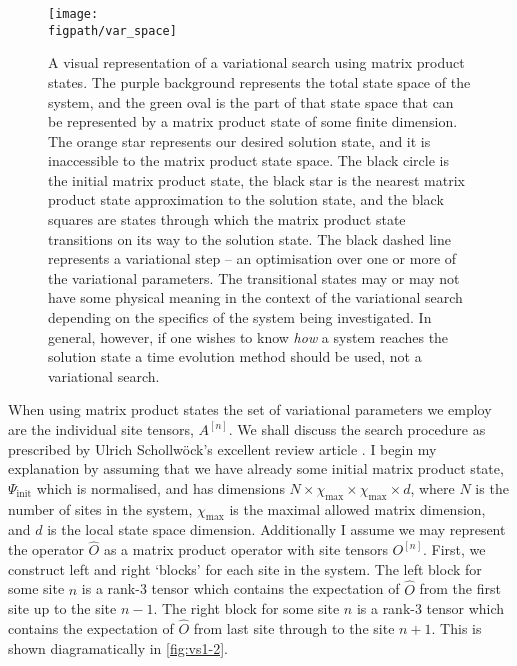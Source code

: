 \begin{figure}[ht!]
\centering
\texttt{[image: \\figpath/var\_space]}
\caption{A visual representation of a variational search using matrix product states. The purple background represents the total state space of the system, and the green oval is the part of that state space that can be represented by a matrix product state of some finite dimension. The orange star represents our desired solution state, and it is inaccessible to the matrix product state space. The black circle is the initial matrix product state, the black star is the nearest matrix product state approximation to the solution state, and the black squares are states through which the matrix product state transitions on its way to the solution state. The black dashed line represents a variational step -- an optimisation over one or more of the variational parameters. The transitional states may or may not have some physical meaning in the context of the variational search depending on the specifics of the system being investigated. In general, however, if one wishes to know \emph{how} a system reaches the solution state a time evolution method should be used, not a variational search.}
\label{fig:vs1-1}
\end{figure}

When using matrix product states the set of variational parameters we employ are the individual site tensors, \(A^{[n]}\). We shall discuss the search procedure as prescribed by Ulrich Schollw\"{o}ck's excellent review article \cite{Schollwoeck11}. I begin my explanation by assuming that we have already some initial matrix product state, \(\Psi_{\mathrm{init}}\) which is normalised, and has dimensions \(N \times \chi_{\mathrm{max}} \times \chi_{\mathrm{max}} \times d\), where \(N\) is the number of sites in the system, \(\chi_{\mathrm{max}}\) is the maximal allowed matrix dimension, and \(d\) is the local state space dimension. Additionally I assume we may represent the operator \(\hat{O}\) as a matrix product operator with site tensors \(O^{[n]}\). First, we construct left and right `blocks' for each site in the system. The left block for some site \(n\) is a rank-3 tensor which contains the expectation of \(\hat{O}\) from the first site up to the site \(n-1\). The right block for some site \(n\) is a rank-3 tensor which contains the expectation of \(\hat{O}\) from last site through to the site \(n+1\). This is shown diagramatically in \cref{fig:vs1-2}.

